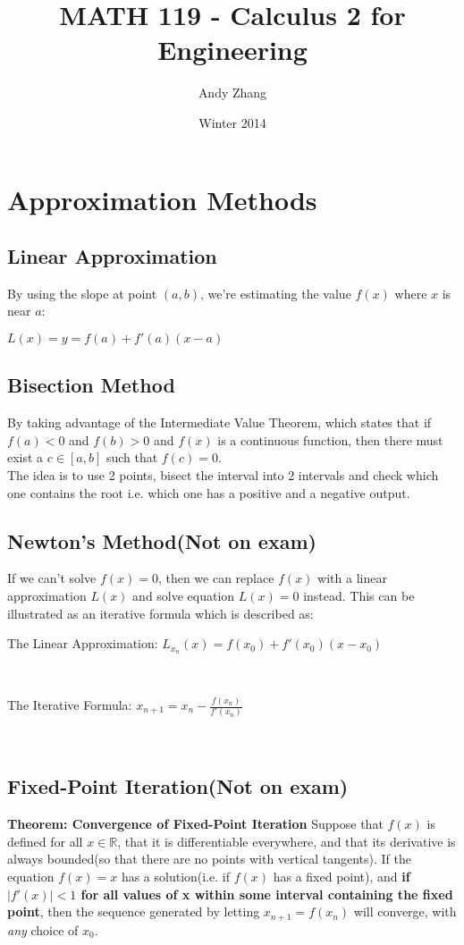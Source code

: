 \documentclass[12pt]{report}
\title{MATH 119 - Calculus 2 for Engineering}
\author{Andy Zhang}
\date{Winter 2014}
\begin{document}
\maketitle
\chapter{Approximation Methods}
	\section{Linear Approximation}
		By using the slope at point $(a,b)$, we're estimating the value $f(x)$ where $x$ is near $a$:\\
		\centerline{$L(x) = y = f(a) + f'(a)(x-a)$}
	\section{Bisection Method}
		By taking advantage of the Intermediate Value Theorem, which states that if $f(a) < 0$ and $f(b) > 0$ and $f(x)$ is a continuous function, then there must exist a $c \in [a,b]$ such that $f(c) = 0$. \\
		The idea is to use 2 points, bisect the interval into 2 intervals and check which one contains the root i.e. which one has a positive and a negative output.
	\section{Newton's Method(Not on exam)}
		If we can't solve $f(x) = 0$, then we can replace $f(x)$ with a linear approximation $L(x)$ and solve equation $L(x) = 0$ instead. This can be illustrated as an iterative formula which is described as:\\
		\centerline{The Linear Approximation: $L_{x_n}(x) = f(x_0) + f'(x_0)(x-x_0)$}\\
		\centerline{The Iterative Formula: $x_{n+1} = x_n - \frac{f(x_n)}{f'(x_n)}$}\\
	\section{Fixed-Point Iteration(Not on exam)}
		\textbf{Theorem: Convergence of Fixed-Point Iteration} Suppose that $f(x)$ is defined for all $x \in \mathbb{R}$, that it is differentiable everywhere, and that its derivative is always bounded(so that there are no points with vertical tangents). If the equation $f(x) = x$ has a solution(i.e. if $f(x)$ has a fixed point), and \textbf{if $|f'(x)| < 1$ for all values of x within some interval containing the fixed point}, then the sequence generated by letting $x_{n+1} = f(x_n)$ will converge, with \textit{any} choice of $x_0$. 
\end{document}
